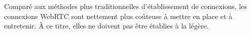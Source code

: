 \noindent Comparé aux méthodes plus traditionnelles d'établissement de
connexions, les connexions WebRTC sont nettement plus coûteuse à mettre en place
et à entretenir. À ce titre, elles ne doivent pas être établies à la légère.
 



